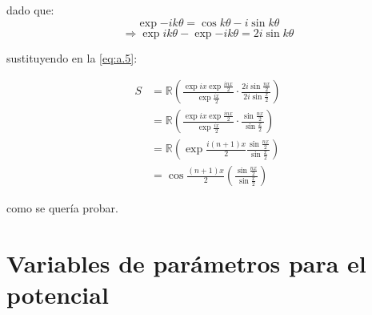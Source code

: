dado que:
\begin{equation*}
  \exp{-ik \theta} = \cos{k \theta} - i\sin{k \theta}
\end{equation*}
\begin{equation*}
  \Longrightarrow \exp{ik \theta} - \exp{-ik \theta} = 2i\sin{k \theta}
\end{equation*}

sustituyendo en la \autoref{eq:a.5}:

\begin{align}
  \label{eq:a.66}
  S &= \mathbb{R} \left( \frac{\exp{ix} \exp{\frac{inx}{2}}}{\exp{\frac{ix}{2}}} \cdot
      \frac{2i \sin{\frac{nx}{2}}}{2i\sin{\frac{x}{2}}} \right) \nonumber\\
  &= \mathbb{R} \left( \frac{\exp{ix} \exp{\frac{inx}{2}}}{\exp{\frac{ix}{2}}} \cdot
    \frac{\sin{\frac{nx}{2}}}{\sin{\frac{x}{2}}} \right) \nonumber\\
    & = \mathbb{R}\left( \exp{\frac{i(n+1)x}{2}} \frac{\sin{\frac{nx}{2}}}{\sin{\frac{x}{2}}} \right)\nonumber\\
  & = \cos{\frac{(n+1)x}{2}}\left(\frac{\sin{\frac{nx}{2}}}{\sin{\frac{x}{2}}} \right)
\end{align}

como se quería probar.























\section{Variables de parámetros para el potencial}

